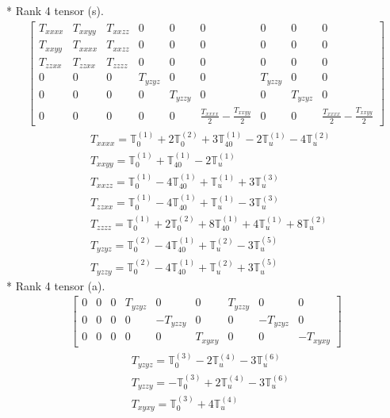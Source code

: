 \documentclass[fleqn,8pt,landscape]{jsarticle}
\begin{document}
* Rank 4 tensor (s).
\begin{align*}
\begin{bmatrix} T_{xxxx} & T_{xxyy} & T_{xxzz} & 0 & 0 & 0 & 0 & 0 & 0 \\ T_{xxyy} & T_{xxxx} & T_{xxzz} & 0 & 0 & 0 & 0 & 0 & 0 \\ T_{zzxx} & T_{zzxx} & T_{zzzz} & 0 & 0 & 0 & 0 & 0 & 0 \\ 0 & 0 & 0 & T_{yzyz} & 0 & 0 & T_{yzzy} & 0 & 0 \\ 0 & 0 & 0 & 0 & T_{yzzy} & 0 & 0 & T_{yzyz} & 0 \\ 0 & 0 & 0 & 0 & 0 & \frac{T_{xxxx}}{2} - \frac{T_{xxyy}}{2} & 0 & 0 & \frac{T_{xxxx}}{2} - \frac{T_{xxyy}}{2} \end{bmatrix}
\end{align*}
\begin{align*}
& T_{xxxx} = \mathbb{T}_{0}^{(1)} + 2 \mathbb{T}_{0}^{(2)} + 3 \mathbb{T}_{40}^{(1)} - 2 \mathbb{T}_{u}^{(1)} - 4 \mathbb{T}_{u}^{(2)} \\
& T_{xxyy} = \mathbb{T}_{0}^{(1)} + \mathbb{T}_{40}^{(1)} - 2 \mathbb{T}_{u}^{(1)} \\
& T_{xxzz} = \mathbb{T}_{0}^{(1)} - 4 \mathbb{T}_{40}^{(1)} + \mathbb{T}_{u}^{(1)} + 3 \mathbb{T}_{u}^{(3)} \\
& T_{zzxx} = \mathbb{T}_{0}^{(1)} - 4 \mathbb{T}_{40}^{(1)} + \mathbb{T}_{u}^{(1)} - 3 \mathbb{T}_{u}^{(3)} \\
& T_{zzzz} = \mathbb{T}_{0}^{(1)} + 2 \mathbb{T}_{0}^{(2)} + 8 \mathbb{T}_{40}^{(1)} + 4 \mathbb{T}_{u}^{(1)} + 8 \mathbb{T}_{u}^{(2)} \\
& T_{yzyz} = \mathbb{T}_{0}^{(2)} - 4 \mathbb{T}_{40}^{(1)} + \mathbb{T}_{u}^{(2)} - 3 \mathbb{T}_{u}^{(5)} \\
& T_{yzzy} = \mathbb{T}_{0}^{(2)} - 4 \mathbb{T}_{40}^{(1)} + \mathbb{T}_{u}^{(2)} + 3 \mathbb{T}_{u}^{(5)}
\end{align*}
* Rank 4 tensor (a).
\begin{align*}
\begin{bmatrix} 0 & 0 & 0 & T_{yzyz} & 0 & 0 & T_{yzzy} & 0 & 0 \\ 0 & 0 & 0 & 0 & - T_{yzzy} & 0 & 0 & - T_{yzyz} & 0 \\ 0 & 0 & 0 & 0 & 0 & T_{xyxy} & 0 & 0 & - T_{xyxy} \end{bmatrix}
\end{align*}
\begin{align*}
& T_{yzyz} = \mathbb{T}_{0}^{(3)} - 2 \mathbb{T}_{u}^{(4)} - 3 \mathbb{T}_{u}^{(6)} \\
& T_{yzzy} = - \mathbb{T}_{0}^{(3)} + 2 \mathbb{T}_{u}^{(4)} - 3 \mathbb{T}_{u}^{(6)} \\
& T_{xyxy} = \mathbb{T}_{0}^{(3)} + 4 \mathbb{T}_{u}^{(4)}
\end{align*}
\end{document}
